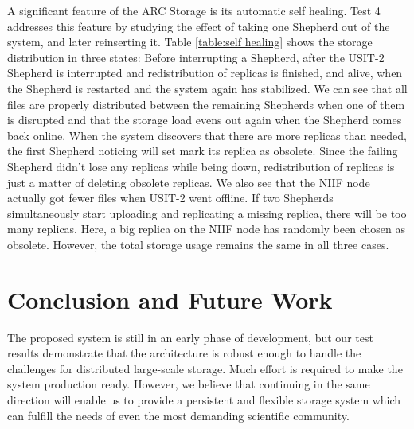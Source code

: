 \documentclass[final]{ieee}
\begin{document}
A significant feature of the ARC Storage is its automatic self
healing. Test 4 addresses this feature by studying the effect of
taking one Shepherd out of the system, and later reinserting it. Table
\ref{table:self healing} shows the storage distribution in three
states: Before interrupting a Shepherd, after the USIT-2
Shepherd is interrupted and redistribution of replicas is finished, and
alive, when the Shepherd is restarted and the system again has stabilized. We
can see that all files are properly distributed between the remaining
Shepherds when one of them is disrupted and that the storage load evens out 
again when the Shepherd comes back online. When the
system discovers that there are more replicas than needed, the first
Shepherd noticing will set mark its replica as obsolete. Since the failing Shepherd didn't lose any replicas while
being down, redistribution of replicas is just a matter of deleting
obsolete replicas. We also see that the NIIF node actually got fewer
files when USIT-2 went offline. If two Shepherds simultaneously
start uploading and replicating a missing replica, there will be too many
replicas. Here, a big replica on the NIIF node has randomly been chosen as
obsolete. However, the total storage usage remains the same in all
three cases.

\section{Conclusion and Future Work}
\label{Conclusion and Future Work}

The proposed system is still in an early phase of development, but our test
results demonstrate that the architecture is robust enough to handle
the challenges for distributed large-scale storage. Much
effort is required to make the system production
ready. However, we believe that continuing in the same direction
will enable us to provide a persistent  and flexible storage system
which can fulfill the needs of even the most demanding scientific community. 
\end{document}
